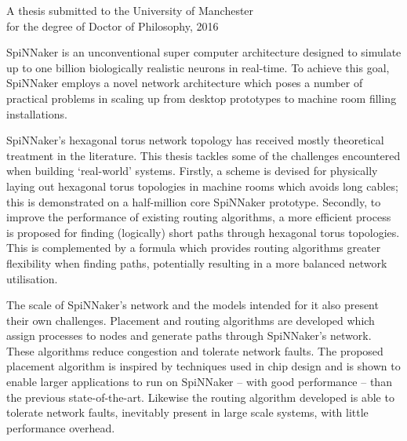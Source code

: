 {
	
	
	
	\vfill
	
	\begin{center}
		\textsc{\large\thesistitle}
		
		\vspace{0.5em}
		
		\thesisauthor
		
		\vspace{0.5em}
		
		A thesis submitted to the University of Manchester\\
		for the degree of Doctor of Philosophy, 2016
	\end{center}
	
	\vfill
	
	
	SpiNNaker is an unconventional super computer architecture designed to
	simulate up to one billion biologically realistic neurons in real-time. To
	achieve this goal, SpiNNaker employs a novel network architecture which poses
	a number of practical problems in scaling up from desktop prototypes to
	machine room filling installations.
	
	SpiNNaker's hexagonal torus network topology has received mostly theoretical
	treatment in the literature. This thesis tackles some of the challenges
	encountered when building `real-world' systems.  Firstly, a scheme is devised
	for physically laying out hexagonal torus topologies in machine rooms which
	avoids long cables; this is demonstrated on a half-million core SpiNNaker
	prototype.  Secondly, to improve the performance of existing routing
	algorithms, a more efficient process is proposed for finding (logically)
	short paths through hexagonal torus topologies. This is complemented by a
	formula which provides routing algorithms greater flexibility when finding
	paths, potentially resulting in a more balanced network utilisation.
	
	The scale of SpiNNaker's network and the models intended for it also present
	their own challenges. Placement and routing algorithms are developed which
	assign processes to nodes and generate paths through SpiNNaker's network.
	These algorithms reduce congestion and tolerate network faults. The proposed
	placement algorithm is inspired by techniques used in chip design and is
	shown to enable larger applications to run on SpiNNaker -- with good
	performance -- than the previous state-of-the-art. Likewise the routing
	algorithm developed is able to tolerate network faults, inevitably present in
	large scale systems, with little performance overhead.
	
	
	\par%
}
